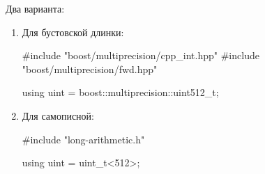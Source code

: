 Два варианта:
\begin{enumerate}
  \item Для бустовской длинки: 
  \begin{cppcode}
#include "boost/multiprecision/cpp_int.hpp"
#include "boost/multiprecision/fwd.hpp"

using uint = boost::multiprecision::uint512_t;
  \end{cppcode}
  \item Для самописной:
  \begin{cppcode}
#include "long-arithmetic.h"

using uint = uint_t<512>;
  \end{cppcode}
\end{enumerate}

